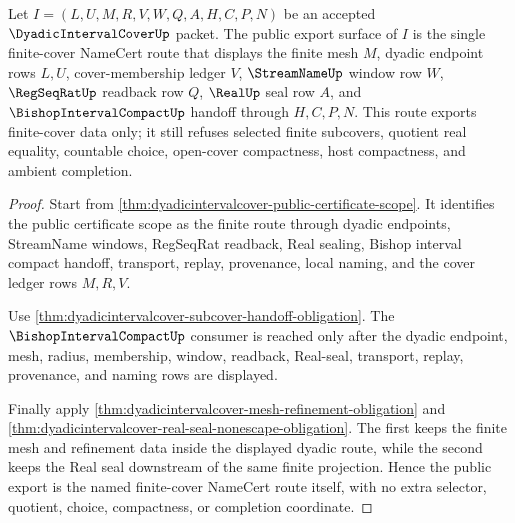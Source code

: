\begin{theorem}
\label{thm:dyadicintervalcover-public-finite-cover-export}
Let $I=(L,U,M,R,V,W,Q,A,H,C,P,N)$ be an accepted $\DyadicIntervalCoverUp$ packet. The public export surface of $I$ is the single finite-cover NameCert route that displays the finite mesh $M$, dyadic endpoint rows $L,U$, cover-membership ledger $V$, $\StreamNameUp$ window row $W$, $\RegSeqRatUp$ readback row $Q$, $\RealUp$ seal row $A$, and $\BishopIntervalCompactUp$ handoff through $H,C,P,N$. This route exports finite-cover data only; it still refuses selected finite subcovers, quotient real equality, countable choice, open-cover compactness, host compactness, and ambient completion.
\end{theorem}
\begin{proof}
Start from \autoref{thm:dyadicintervalcover-public-certificate-scope}. It identifies the public certificate scope as the finite route through dyadic endpoints, StreamName windows, RegSeqRat readback, Real sealing, Bishop interval compact handoff, transport, replay, provenance, local naming, and the cover ledger rows $M,R,V$.

Use \autoref{thm:dyadicintervalcover-subcover-handoff-obligation}. The $\BishopIntervalCompactUp$ consumer is reached only after the dyadic endpoint, mesh, radius, membership, window, readback, Real-seal, transport, replay, provenance, and naming rows are displayed.

Finally apply \autoref{thm:dyadicintervalcover-mesh-refinement-obligation} and \autoref{thm:dyadicintervalcover-real-seal-nonescape-obligation}. The first keeps the finite mesh and refinement data inside the displayed dyadic route, while the second keeps the Real seal downstream of the same finite projection. Hence the public export is the named finite-cover NameCert route itself, with no extra selector, quotient, choice, compactness, or completion coordinate.
\end{proof}
